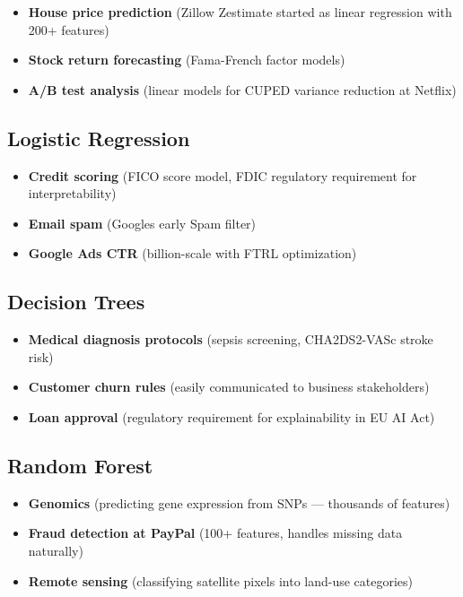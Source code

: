 \documentclass[11pt]{article}
\providecommand{\tightlist}{\setlength{\itemsep}{1pt}\setlength{\parskip}{0pt}}
\begin{document}
\begin{itemize}
\tightlist
\item
  \textbf{House price prediction} (Zillow Zestimate started as linear regression with 200+ features)
\item
  \textbf{Stock return forecasting} (Fama-French factor models)
\item
  \textbf{A/B test analysis} (linear models for CUPED variance reduction at Netflix)
\end{itemize}

\subsection{Logistic Regression}\label{logistic-regression}

\begin{itemize}
\tightlist
\item
  \textbf{Credit scoring} (FICO score model, FDIC regulatory requirement for interpretability)
\item
  \textbf{Email spam} (Google\textquotesingle s early Spam filter)
\item
  \textbf{Google Ads CTR} (billion-scale with FTRL optimization)
\end{itemize}

\subsection{Decision Trees}\label{decision-trees}

\begin{itemize}
\tightlist
\item
  \textbf{Medical diagnosis protocols} (sepsis screening, CHA2DS2-VASc stroke risk)
\item
  \textbf{Customer churn rules} (easily communicated to business stakeholders)
\item
  \textbf{Loan approval} (regulatory requirement for explainability in EU AI Act)
\end{itemize}

\subsection{Random Forest}\label{random-forest}

\begin{itemize}
\tightlist
\item
  \textbf{Genomics} (predicting gene expression from SNPs --- thousands of features)
\item
  \textbf{Fraud detection at PayPal} (100+ features, handles missing data naturally)
\item
  \textbf{Remote sensing} (classifying satellite pixels into land-use categories)
\end{itemize}
\end{document}
